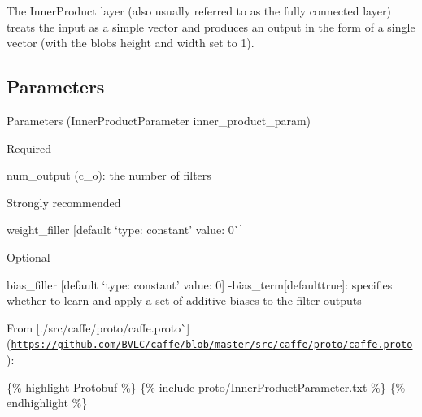 The {\ttfamily Inner\+Product} layer (also usually referred to as the fully connected layer) treats the input as a simple vector and produces an output in the form of a single vector (with the blob\textquotesingle{}s height and width set to 1).

\subsection*{Parameters}


\begin{DoxyItemize}
\item Parameters ({\ttfamily Inner\+Product\+Parameter inner\+\_\+product\+\_\+param})
\begin{DoxyItemize}
\item Required
\begin{DoxyItemize}
\item {\ttfamily num\+\_\+output} ({\ttfamily c\+\_\+o})\+: the number of filters
\end{DoxyItemize}
\item Strongly recommended
\begin{DoxyItemize}
\item {\ttfamily weight\+\_\+filler} \mbox{[}default `type\+: \textquotesingle{}constant' value\+: 0\`{}\mbox{]}
\end{DoxyItemize}
\item Optional
\begin{DoxyItemize}
\item {\ttfamily bias\+\_\+filler} \mbox{[}default `type\+: \textquotesingle{}constant' value\+: 0{\ttfamily \mbox{]} -\/}bias\+\_\+term{\ttfamily \mbox{[}default}true{\ttfamily \mbox{]}\+: specifies whether to learn and apply a set of additive biases to the filter outputs}
\end{DoxyItemize}
\end{DoxyItemize}
\item {\ttfamily From \mbox{[}}./src/caffe/proto/caffe.proto\`{}\mbox{]}(\href{https://github.com/BVLC/caffe/blob/master/src/caffe/proto/caffe.proto}{\tt https\+://github.\+com/\+B\+V\+L\+C/caffe/blob/master/src/caffe/proto/caffe.\+proto})\+:
\end{DoxyItemize}

\{\% highlight Protobuf \%\} \{\% include proto/\+Inner\+Product\+Parameter.\+txt \%\} \{\% endhighlight \%\} 